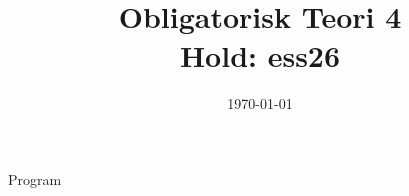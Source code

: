 \documentclass[11pt,aspectratio=169]{beamer}
\title{Obligatorisk Teori 4 \\
Hold: ess26}
\date{\today}
\begin{document}
\begin{frame}
  \titlepage
\end{frame}

\begin{frame}{Program}
  \tableofcontents
\end{frame}



























%

%

%

%
\end{document}
